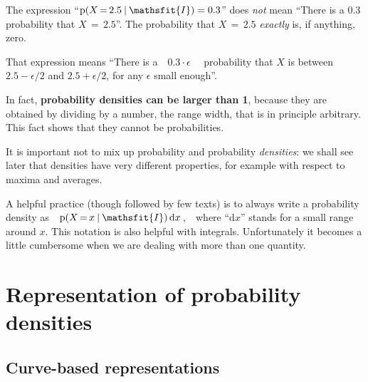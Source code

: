 \documentclass[
  a4paper,
  DIV=11,
  numbers=noendperiod,
  oneside]{scrreprt}
\begin{document}
\begin{tcolorbox}[enhanced jigsaw, rightrule=.15mm, bottomtitle=1mm, leftrule=.75mm, toprule=.15mm, colframe=quarto-callout-warning-color-frame, coltitle=black, titlerule=0mm, bottomrule=.15mm, opacitybacktitle=0.6, title={\faIcon{exclamation-circle} Probability densities are not probabilities}, arc=.35mm, toptitle=1mm, colback=white, opacityback=0, colbacktitle=quarto-callout-warning-color!10!white, breakable, left=2mm]

The expression
{``\(\mathrm{p}(X\mathord{\,=\,}2.5 \nonscript\:\vert\nonscript\:\mathopen{} \mathsfit{I})=0.3\)''}
does \emph{not} mean ``There is a \(0.3\) probability that
\(X\mathord{\,=\,}2.5\)''. The probability that \(X\mathord{\,=\,}2.5\)
\emph{exactly} is, if anything, zero.

That expression means ``There is a~~\(0.3\cdot \epsilon\)~~ probability
that \(X\) is between \(2.5-\epsilon/2\) and \(2.5+\epsilon/2\), for any
\(\epsilon\) small enough''.

In fact, \textbf{probability densities can be larger than 1}, because
they are obtained by dividing by a number, the range width, that is in
principle arbitrary. This fact shows that they cannot be probabilities.

It is important not to mix up probability and probability
\emph{densities}: we shall see later that densities have very different
properties, for example with respect to maxima and averages.

\end{tcolorbox}

A helpful practice (though followed by few texts) is to always write a
probability density
as~~{\(\mathrm{p}(X\mathord{\,=\,}x \nonscript\:\vert\nonscript\:\mathopen{} \mathsfit{I})\,\mathrm{d}x\)\,,}~~where
{``\(\mathrm{d}x\)''} stands for a small range around \(x\). This
notation is also helpful with integrals. Unfortunately it becomes a
little cumbersome when we are dealing with more than one quantity.

\hypertarget{representation-of-probability-densities}{%
\section{Representation of probability
densities}\label{representation-of-probability-densities}}

\hypertarget{curve-based-representations-1}{%
\subsection{Curve-based
representations}\label{curve-based-representations-1}}
\end{document}
